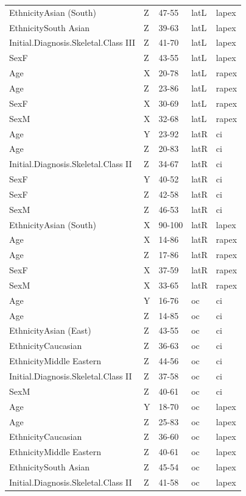 \documentclass[AMA,Times1COL]{WileyNJDv5} %
\begin{document}
\begin{table}
{{\begin{tabular}[t]{lllll}
EthnicityAsian (South) & Z & 47-55 & latL & lapex\\
EthnicitySouth Asian & Z & 39-63 & latL & lapex\\
Initial.Diagnosis.Skeletal.Class III & Z & 41-70 & latL & lapex\\
\addlinespace
SexF & Z & 43-55 & latL & lapex\\
Age & X & 20-78 & latL & rapex\\
Age & Z & 23-86 & latL & rapex\\
SexF & X & 30-69 & latL & rapex\\
SexM & X & 32-68 & latL & rapex\\
\addlinespace
Age & Y & 23-92 & latR & ci\\
Age & Z & 20-83 & latR & ci\\
Initial.Diagnosis.Skeletal.Class II & Z & 34-67 & latR & ci\\
SexF & Y & 40-52 & latR & ci\\
SexF & Z & 42-58 & latR & ci\\
\addlinespace
SexM & Z & 46-53 & latR & ci\\
EthnicityAsian (South) & X & 90-100 & latR & lapex\\
Age & X & 14-86 & latR & rapex\\
Age & Z & 17-86 & latR & rapex\\
SexF & X & 37-59 & latR & rapex\\
\addlinespace
SexM & X & 33-65 & latR & rapex\\
Age & Y & 16-76 & oc & ci\\
Age & Z & 14-85 & oc & ci\\
EthnicityAsian (East) & Z & 43-55 & oc & ci\\
EthnicityCaucasian & Z & 36-63 & oc & ci\\
\addlinespace
EthnicityMiddle Eastern & Z & 44-56 & oc & ci\\
Initial.Diagnosis.Skeletal.Class II & Z & 37-58 & oc & ci\\
SexM & Z & 40-61 & oc & ci\\
Age & Y & 18-70 & oc & lapex\\
Age & Z & 25-83 & oc & lapex\\
\addlinespace
EthnicityCaucasian & Z & 36-60 & oc & lapex\\
EthnicityMiddle Eastern & Z & 40-61 & oc & lapex\\
EthnicitySouth Asian & Z & 45-54 & oc & lapex\\
Initial.Diagnosis.Skeletal.Class II & Z & 41-58 & oc & lapex\\

\end{tabular}}}
\end{table}
\end{document}
